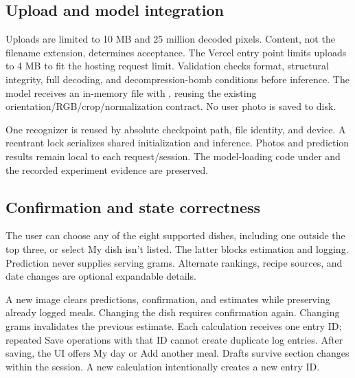 \documentclass[11pt,a4paper]{article}
\newcommand{\code}[1]{\texttt{\detokenize{#1}}}
\begin{document}
\begin{center}
\end{center}

\subsection{Upload and model integration}
Uploads are limited to 10 MB and 25 million decoded pixels. Content, not the
filename extension, determines acceptance. The Vercel entry point limits uploads
to 4 MB to fit the hosting request limit. Validation checks format, structural
integrity, full decoding, and decompression-bomb conditions before inference.
The model receives an in-memory file with \code{prepared=False}, reusing the
existing orientation/RGB/crop/normalization contract. No user photo is saved to disk.

One recognizer is reused by absolute checkpoint path, file identity, and device.
A reentrant lock serializes shared initialization and inference. Photos and
prediction results remain local to each request/session. The model-loading code
under \code{models/} and the recorded experiment evidence are preserved.

\subsection{Confirmation and state correctness}
The user can choose any of the eight supported dishes, including one outside the
top three, or select My dish isn't listed. The latter blocks estimation and
logging. Prediction never supplies serving grams. Alternate rankings, recipe
sources, and date changes are optional expandable details.

A new image clears predictions, confirmation, and estimates while preserving
already logged meals. Changing the dish requires confirmation again. Changing
grams invalidates the previous estimate. Each calculation receives one entry ID;
repeated Save operations with that ID cannot create duplicate log entries. After
saving, the UI offers My day or Add another meal. Drafts survive section changes
within the session. A new calculation intentionally creates a new entry ID.
\end{document}

